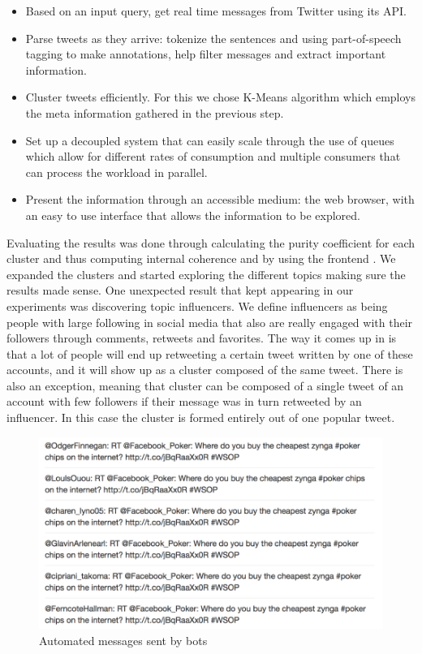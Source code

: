 \begin{itemize}
	\item Based on an input query, get real time messages from Twitter using its API.
	\item Parse tweets as they arrive: tokenize the sentences and using part-of-speech tagging to make annotations, help filter messages and extract important information.
	\item Cluster tweets efficiently. For this we chose K-Means algorithm which employs the meta information gathered in the previous step.
	\item Set up a decoupled system that can easily scale through the use of queues which allow for different rates of consumption and multiple consumers that can process the workload in parallel.
	\item Present the information through an accessible medium: the web browser, with an easy to use interface that allows the information to be explored.
\end{itemize}
Evaluating the results was done through calculating the purity coefficient for each cluster and thus computing internal coherence and by using the frontend {\frontend}. We expanded the clusters and started exploring the different topics making sure the results made sense.
One unexpected result that kept appearing in our experiments was discovering topic influencers. We define influencers as being people with large following in social media that also are really engaged with their followers through comments, retweets and favorites. The way it comes up in {\project}  is that a lot of people will end up retweeting a certain tweet written by one of these accounts, and it will show up as a cluster composed of the same tweet. There is also an exception, meaning that cluster can be composed of a single tweet of an account with few followers if their message was in turn retweeted by an influencer. In this case the cluster is formed entirely out of one popular tweet.
\newline
\begin{figure}[ht!]
\centering
\includegraphics[width=\textwidth,height=\textheight,keepaspectratio]{src/img/bots.png}
\caption{Automated messages sent by bots\label{overflow}}
\end{figure}
